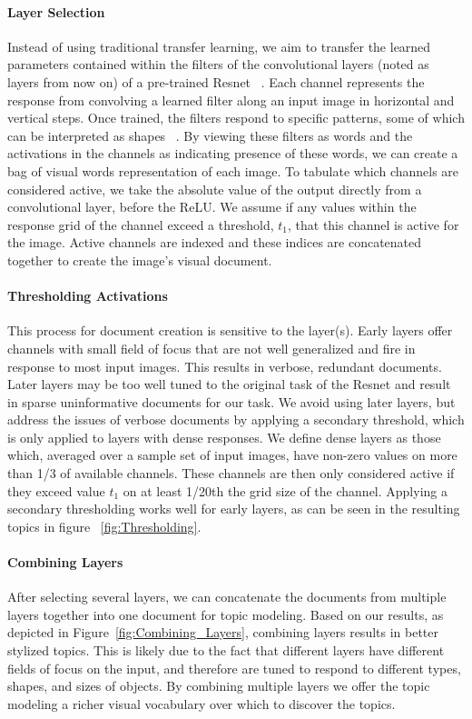 \documentclass[10pt,twocolumn,letterpaper]{article}
\begin{document}
\paragraph{Layer Selection}
Instead of using traditional transfer learning, we aim to transfer the learned parameters contained within the filters of the convolutional layers (noted as layers from now on) of a pre-trained Resnet ~\cite{rafegas2017understanding}. Each channel represents the response from convolving a learned filter along an input image in horizontal and vertical steps. Once trained, the filters respond to specific patterns, some of which can be interpreted as shapes ~\cite{yosinski2015understanding,zeiler2014visualizing}. By viewing these filters as words and the activations in the channels as indicating presence of these words, we can create a bag of visual words representation of each image. To tabulate which channels are considered active, we take the absolute value of the output directly from a convolutional layer, before the ReLU. We assume if any values within the response grid of the channel exceed a threshold, $t_1$, that this channel is active for the image. Active channels are indexed and these indices are concatenated together to create the image's visual document.

\paragraph{Thresholding Activations}
This process for document creation is sensitive to the layer(s). Early layers offer channels with small field of focus that are not well generalized and fire in response to most input images. This results in verbose, redundant documents. Later layers may be too well tuned to the original task of the Resnet and result in sparse uninformative documents for our task. We avoid using later layers, but address the issues of verbose documents by applying a secondary threshold, which is only applied to layers with dense responses. We define dense layers as those which, averaged over a sample set of input images, have non-zero values on more than 1/3 of available channels. These channels are then only considered active if they exceed value $t_1$ on at least 1/20th the grid size of the channel. Applying a secondary thresholding works well for early layers, as can be seen in the resulting topics in figure ~\ref{fig:Thresholding}.  

\paragraph{Combining Layers}
After selecting several layers, we can concatenate the documents from multiple layers together into one document for topic modeling. Based on our results, as depicted in Figure~\ref{fig:Combining_Layers}, combining layers results in better stylized topics. This is likely due to the fact that different layers have different fields of focus on the input, and therefore are tuned to respond to different types, shapes, and sizes of objects. By combining multiple layers we offer the topic modeling a richer visual vocabulary over which to discover the topics.
\end{document}
